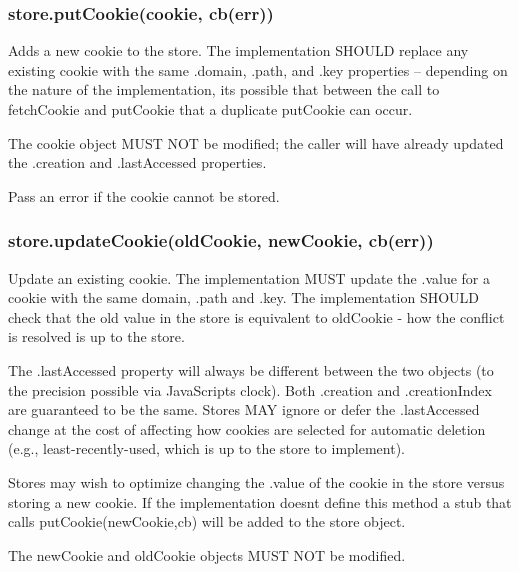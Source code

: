 \subsubsection*{{\ttfamily store.\+put\+Cookie(cookie, cb(err))}}

Adds a new cookie to the store. The implementation S\+H\+O\+U\+LD replace any existing cookie with the same {\ttfamily .domain}, {\ttfamily .path}, and {\ttfamily .key} properties -- depending on the nature of the implementation, it\textquotesingle{}s possible that between the call to {\ttfamily fetch\+Cookie} and {\ttfamily put\+Cookie} that a duplicate {\ttfamily put\+Cookie} can occur.

The {\ttfamily cookie} object M\+U\+ST N\+OT be modified; the caller will have already updated the {\ttfamily .creation} and {\ttfamily .last\+Accessed} properties.

Pass an error if the cookie cannot be stored.

\subsubsection*{{\ttfamily store.\+update\+Cookie(old\+Cookie, new\+Cookie, cb(err))}}

Update an existing cookie. The implementation M\+U\+ST update the {\ttfamily .value} for a cookie with the same {\ttfamily domain}, {\ttfamily .path} and {\ttfamily .key}. The implementation S\+H\+O\+U\+LD check that the old value in the store is equivalent to {\ttfamily old\+Cookie} -\/ how the conflict is resolved is up to the store.

The {\ttfamily .last\+Accessed} property will always be different between the two objects (to the precision possible via Java\+Script\textquotesingle{}s clock). Both {\ttfamily .creation} and {\ttfamily .creation\+Index} are guaranteed to be the same. Stores M\+AY ignore or defer the {\ttfamily .last\+Accessed} change at the cost of affecting how cookies are selected for automatic deletion (e.\+g., least-\/recently-\/used, which is up to the store to implement).

Stores may wish to optimize changing the {\ttfamily .value} of the cookie in the store versus storing a new cookie. If the implementation doesn\textquotesingle{}t define this method a stub that calls {\ttfamily put\+Cookie(new\+Cookie,cb)} will be added to the store object.

The {\ttfamily new\+Cookie} and {\ttfamily old\+Cookie} objects M\+U\+ST N\+OT be modified.

